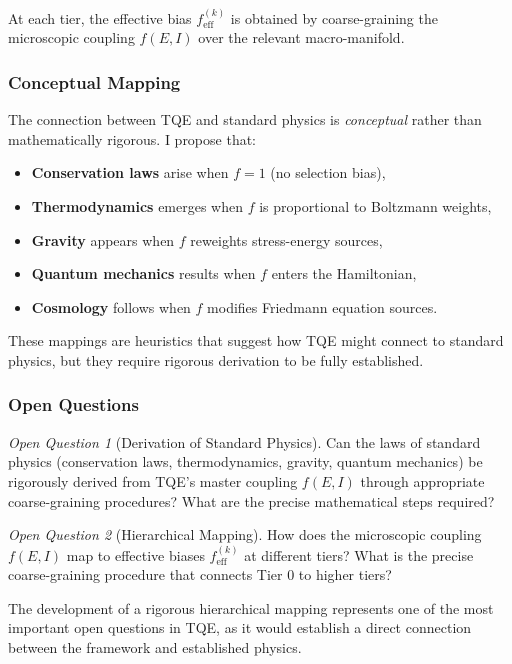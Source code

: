 \documentclass[12pt,a4paper]{article}
\theoremstyle{definition}
\theoremstyle{remark}
\newtheorem{question}{Open Question}[section]
\begin{document}
At each tier, the effective bias $f^{(k)}_{\text{eff}}$ is obtained by coarse-graining the microscopic coupling $f(E, I)$ over the relevant macro-manifold.

\subsubsection{Conceptual Mapping}

The connection between TQE and standard physics is \emph{conceptual} rather than mathematically rigorous. I propose that:

\begin{itemize}
\item \textbf{Conservation laws} arise when $f = 1$ (no selection bias),
\item \textbf{Thermodynamics} emerges when $f$ is proportional to Boltzmann weights,
\item \textbf{Gravity} appears when $f$ reweights stress-energy sources,
\item \textbf{Quantum mechanics} results when $f$ enters the Hamiltonian,
\item \textbf{Cosmology} follows when $f$ modifies Friedmann equation sources.
\end{itemize}

These mappings are heuristics that suggest how TQE might connect to standard physics, but they require rigorous derivation to be fully established.

\subsubsection{Open Questions}

\begin{question}[Derivation of Standard Physics]
Can the laws of standard physics (conservation laws, thermodynamics, gravity, quantum mechanics) be rigorously derived from TQE's master coupling $f(E,I)$ through appropriate coarse-graining procedures? What are the precise mathematical steps required?
\end{question}

\begin{question}[Hierarchical Mapping]
How does the microscopic coupling $f(E, I)$ map to effective biases $f^{(k)}_{\text{eff}}$ at different tiers? What is the precise coarse-graining procedure that connects Tier 0 to higher tiers?
\end{question}

The development of a rigorous hierarchical mapping represents one of the most important open questions in TQE, as it would establish a direct connection between the framework and established physics.
\end{document}
